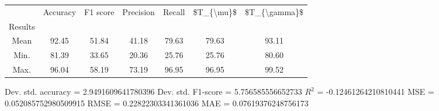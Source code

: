 \begin{tabular}{|c|c|c|c|c|c|c|}
\toprule
{} &  Accuracy &  F1 score &  Precision &  Recall &  \$T\_\{\textbackslash mu\}\$ &  \$T\_\{\textbackslash gamma\}\$ \\
Results &           &           &            &         &            &               \\
\hline
Mean    &     92.45 &     51.84 &      41.18 &   79.63 &      79.63 &         93.11 \\
Min.    &     81.39 &     33.65 &      20.36 &   25.76 &      25.76 &         80.60 \\
Max.    &     96.04 &     58.19 &      73.19 &   96.95 &      96.95 &         99.52 \\
\bottomrule
\end{tabular}

 Dev. std. accuracy = 2.9491609641780396
 Dev. std. F1-score = 5.756585556652733
 $R^2$ = -0.12461264210810441
 MSE = 0.052085752980509915
 RMSE = 0.22822303341361036
 MAE = 0.07619376248756173